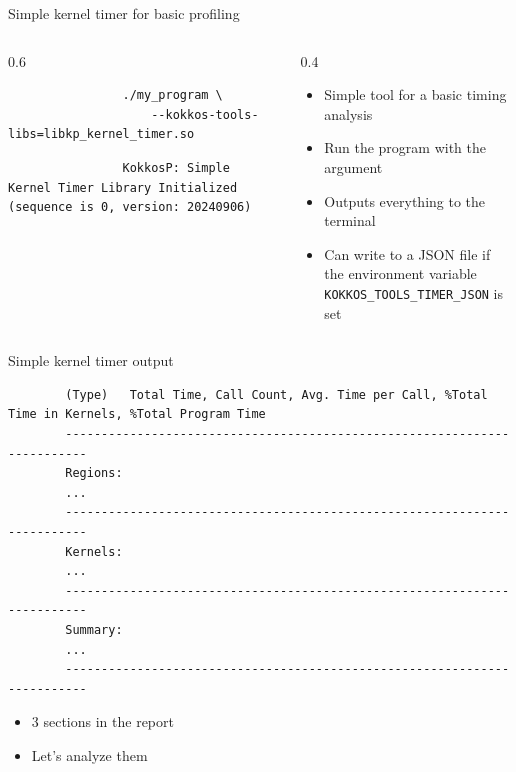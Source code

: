 \documentclass[
    aspectratio=169,
    \createHandout
]{beamer}
\begin{document}
\begin{frame}[fragile]{Simple kernel timer for basic profiling}
    \begin{columns}
        \begin{column}{0.6\linewidth}
            \begin{verbatim}
                ./my_program \
                    --kokkos-tools-libs=libkp_kernel_timer.so
            \end{verbatim}

            \begin{verbatim}
                KokkosP: Simple Kernel Timer Library Initialized (sequence is 0, version: 20240906)
            \end{verbatim}

        \end{column}
        \begin{column}{0.4\linewidth}
            \begin{itemize}
                \item Simple tool for a basic timing analysis
                \item Run the program with the argument
                \item Outputs everything to the terminal
                \item Can write to a JSON file if the environment variable \texttt{KOKKOS\_TOOLS\_TIMER\_JSON} is set
            \end{itemize}
        \end{column}
    \end{columns}
\end{frame}

\begin{frame}[fragile]{Simple kernel timer output}
    \begin{verbatim}
        (Type)   Total Time, Call Count, Avg. Time per Call, %Total Time in Kernels, %Total Program Time
        -------------------------------------------------------------------------
        Regions:
        ...
        -------------------------------------------------------------------------
        Kernels:
        ...
        -------------------------------------------------------------------------
        Summary:
        ...
        -------------------------------------------------------------------------
    \end{verbatim}
    \begin{itemize}
        \item 3 sections in the report
        \item Let's analyze them
    \end{itemize}
\end{frame}
\end{document}
